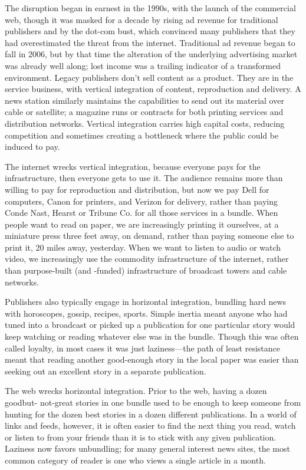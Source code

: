 The disruption began in earnest in the 1990s, with the launch of the commercial
web, though it was masked for a decade by rising ad revenue for traditional publishers
and by the dot-com bust, which convinced many publishers that they had overestimated
the threat from the internet. Traditional ad revenue began to fall in 2006,
but by that time the alteration of the underlying advertising market was already
well along; lost income was a trailing indicator of a transformed environment.
Legacy publishers don’t sell content as a product. They are in the service business,
with vertical integration of content, reproduction and delivery. A news station
similarly maintains the capabilities to send out its material over cable or satellite; a
magazine runs or contracts for both printing services and distribution networks.
Vertical integration carries high capital costs, reducing competition and sometimes
creating a bottleneck where the public could be induced to pay.

The internet wrecks vertical integration, because everyone pays for the infrastructure,
then everyone gets to use it. The audience remains more than willing
to pay for reproduction and distribution, but now we pay Dell for computers,
Canon for printers, and Verizon for delivery, rather than paying Conde Nast,
Hearst or Tribune Co. for all those services in a bundle.
When people want to read on paper, we are increasingly printing it ourselves,
at a miniature press three feet away, on demand, rather than paying someone
else to print it, 20 miles away, yesterday. When we want to listen to audio or
watch video, we increasingly use the commodity infrastructure of the internet,
rather than purpose-built (and -funded) infrastructure of broadcast towers and
cable networks.

Publishers also typically engage in horizontal integration, bundling hard news
with horoscopes, gossip, recipes, sports. Simple inertia meant anyone who had
tuned into a broadcast or picked up a publication for one particular story would
keep watching or reading whatever else was in the bundle. Though this was often
called loyalty, in most cases it was just laziness—the path of least resistance meant
that reading another good-enough story in the local paper was easier than seeking
out an excellent story in a separate publication.

The web wrecks horizontal integration. Prior to the web, having a dozen goodbut-
not-great stories in one bundle used to be enough to keep someone from
hunting for the dozen best stories in a dozen different publications. In a world of
links and feeds, however, it is often easier to find the next thing you read, watch
or listen to from your friends than it is to stick with any given publication. Laziness
now favors unbundling; for many general interest news sites, the most common
category of reader is one who views a single article in a month.

